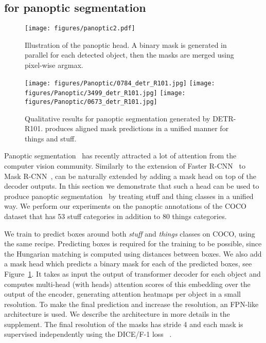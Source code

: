 \subsection{\detr for panoptic segmentation}


\begin{figure}[h]
    \centering\small
    \texttt{[image: figures/panoptic2.pdf]}
    \caption{
    Illustration of the panoptic head. A binary mask is generated in parallel for each detected object, then the masks are merged using  pixel-wise argmax. }
    \label{fig:pano}
\end{figure}
\begin{figure}[h]
    \centering\small
    \texttt{[image: figures/Panoptic/0784\_detr\_R101.jpg]}
    \texttt{[image: figures/Panoptic/3499\_detr\_R101.jpg]}
    \texttt{[image: figures/Panoptic/0673\_detr\_R101.jpg]}
    \caption{
    Qualitative results for panoptic segmentation generated by DETR-R101. \detr produces aligned mask predictions in a unified manner for things and stuff.
    }
    \label{fig:pano_quali}
\end{figure}

Panoptic segmentation~\cite{Kirillov2019panoptic} has recently attracted a lot of attention from the computer vision community. Similarly to the extension of Faster R-CNN~\cite{Ren2015FasterRT} to Mask R-CNN~\cite{He2017MaskR}, \detr can be naturally extended by adding a mask head on top of the decoder outputs. In this section we demonstrate that such a head can be used to produce panoptic segmentation~\cite{Kirillov2019panoptic} by treating stuff and thing classes in a unified way. We perform our experiments on the panoptic annotations of the COCO dataset that has 53 stuff categories in addition to 80 things categories.

We train \detr to predict boxes around both \emph{stuff} and \emph{things}
classes on COCO, using the same recipe. Predicting boxes is required for the
training to be possible, since the Hungarian matching is computed using
distances between boxes. We also add a mask head which predicts a binary mask
for each of the predicted boxes, see Figure~\ref{fig:pano}. It takes as input
the output of transformer decoder for each object and computes multi-head (with
 heads) attention scores of this embedding over the output of the encoder,
generating  attention heatmaps per object in a small resolution. To make the
final prediction and increase the resolution, an FPN-like architecture is used.
We describe the architecture in more details in the supplement. The final
resolution of the masks has stride 4 and each mask is supervised independently
using the DICE/F-1 loss~\cite{milletari2016v} .

